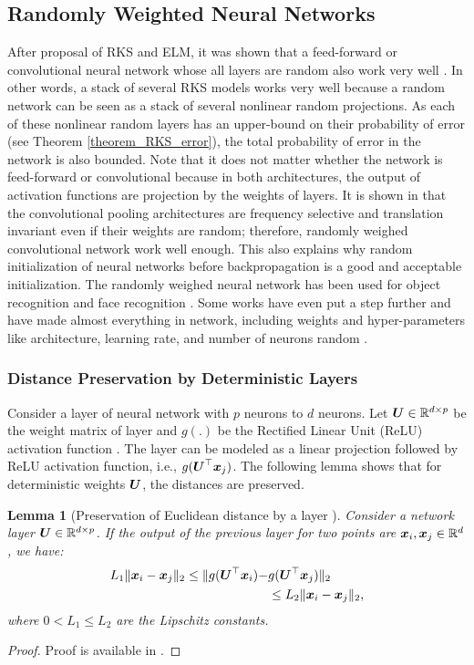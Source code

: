 \documentclass{article}
\newtheorem{lemma}{Lemma}
\def\b{\ensuremath\boldsymbol}
\begin{document}
\subsection{Randomly Weighted Neural Networks}

After proposal of RKS and ELM, it was shown that a feed-forward or convolutional neural network whose all layers are random also work very well \cite{jarrett2009best}. In other words, a stack of several RKS models works very well because a random network can be seen as a stack of several nonlinear random projections. As each of these nonlinear random layers has an upper-bound on their probability of error (see Theorem \ref{theorem_RKS_error}), the total probability of error in the network is also bounded. 
Note that it does not matter whether the network is feed-forward or convolutional because in both architectures, the output of activation functions are projection by the weights of layers. 
It is shown in \cite{saxe2011random} that the convolutional pooling architectures are frequency selective and translation invariant even if their weights are random; therefore, randomly weighed convolutional network work well enough. 
This also explains why random initialization of neural networks before backpropagation is a good and acceptable initialization. 
The randomly weighed neural network has been used for object recognition \cite{jarrett2009best,chung2016random} and face recognition \cite{cox2011beyond}. 
Some works have even put a step further and have made almost everything in network, including weights and hyper-parameters like architecture, learning rate, and number of neurons random \cite{pinto2009high}. 

\subsubsection{Distance Preservation by Deterministic Layers}

Consider a layer of neural network with $p$ neurons to $d$ neurons. Let $\b{U} \in \mathbb{R}^{d \times p}$ be the weight matrix of layer and $g(.)$ be the Rectified Linear Unit (ReLU) activation function \cite{glorot2011deep}. 
The layer can be modeled as a linear projection followed by ReLU activation function, i.e., $g(\b{U}^\top \b{x}_j)$.
The following lemma shows that for deterministic weights $\b{U}$, the distances are preserved. 
\begin{lemma}[Preservation of Euclidean distance by a layer \cite{bruna2013learning,bruna2014signal}]
Consider a network layer $\b{U} \in \mathbb{R}^{d \times p}$.
If the output of the previous layer for two points are $\b{x}_i, \b{x}_j \in \mathbb{R}^d$, we have:
\begin{align}
L_1 \|\b{x}_i - \b{x}_j\|_2 \leq \|g(\b{U}^\top \b{x}_i) -& g(\b{U}^\top \b{x}_j)\|_2 \nonumber\\
&\leq L_2 \|\b{x}_i - \b{x}_j\|_2, 
\end{align}
where $0 < L_1 \leq L_2$ are the Lipschitz constants. 
\end{lemma}
\begin{proof}
Proof is available in \cite{bruna2014signal}. 
\end{proof}
\end{document}
